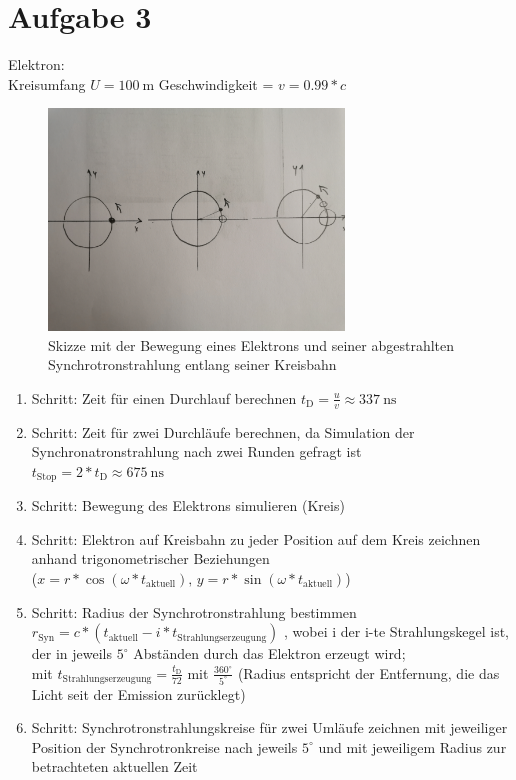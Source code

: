 \documentclass[11pt,a4paper]{article}
\begin{document}
    \section*{Aufgabe 3}
        Elektron: \\
            Kreisumfang \(U = \SI{100}{\metre}\)
            Geschwindigkeit = \( v = 0.99*c \)
        \begin{figure}[h]
            \centering
            \includegraphics[width=0.7\textwidth]{Synchrotron_Skizze.jpg}
            \caption{Skizze mit der Bewegung eines Elektrons und seiner abgestrahlten Synchrotronstrahlung entlang seiner Kreisbahn}
        \end{figure}
        \begin{enumerate}
            \item Schritt: Zeit für einen Durchlauf berechnen \( t_{\mathrm{D}} = \frac{u}{v} \approx \SI{337}{\nano\second}\) 
            \item Schritt: Zeit für zwei Durchläufe berechnen, da Simulation der Synchronatronstrahlung nach zwei Runden gefragt ist \\
            \( t_{\mathrm{Stop}} = 2*t_{\mathrm{D}} \approx \SI{675}{\nano\second}\) 
            \item Schritt: Bewegung des Elektrons simulieren (Kreis)
            \item Schritt: Elektron auf Kreisbahn zu jeder Position auf dem Kreis zeichnen anhand trigonometrischer Beziehungen \\
            (\( x = r * \cos(\omega * t_{ \mathrm{aktuell} } ) , \, y = r * \sin(\omega * t_{ \mathrm{aktuell} } ) \))
            \item Schritt: Radius der Synchrotronstrahlung bestimmen \\
            \( r_{\mathrm{Syn}} = c*(t_{ \mathrm{aktuell} } - i * t_{ \mathrm{Strahlungserzeugung} } ) \) , 
            wobei i der i-te Strahlungskegel ist, der in jeweils \( 5 ^\circ\) Abständen durch das Elektron erzeugt wird; \\
            mit \( t_{\mathrm{Strahlungserzeugung}} = \frac{t_{\mathrm{D}}}{72} \) mit \( \frac{360 ^\circ}{5 ^\circ} \) 
            (Radius entspricht der Entfernung, die das Licht seit der Emission zurücklegt)
            \item Schritt: Synchrotronstrahlungskreise für zwei Umläufe zeichnen mit jeweiliger Position der Synchrotronkreise 
            nach jeweils \( 5 ^\circ\) und mit jeweiligem Radius zur betrachteten aktuellen Zeit 
        \end{enumerate}
\end{document}

